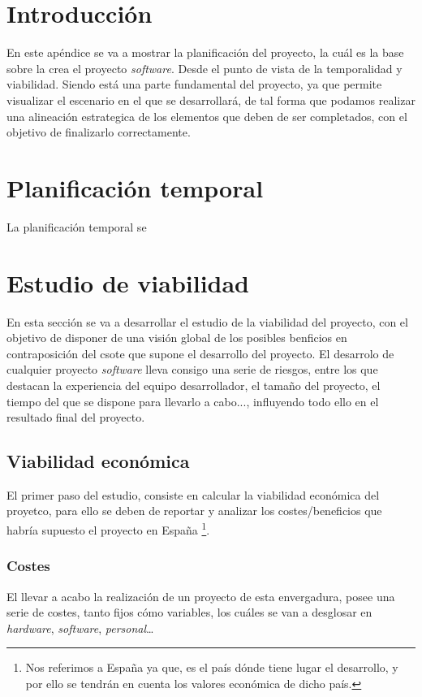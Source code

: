 
\section{Introducción}
En este apéndice se va a mostrar la planificación del proyecto, la cuál es la base sobre la crea el proyecto \textit{software}. Desde el punto de vista de la temporalidad y viabilidad. 
Siendo está una parte fundamental del proyecto, ya que permite visualizar el escenario en el que se desarrollará, de tal forma que podamos realizar una alineación estrategica de los elementos que deben de ser completados, con el objetivo de finalizarlo correctamente.

\section{Planificación temporal}
La planificación temporal se

\section{Estudio de viabilidad}
En esta sección se va a desarrollar el estudio de la viabilidad del proyecto, con el objetivo de disponer de una visión global de los posibles benficios en contraposición del csote que supone el desarrollo del proyecto.
El desarrolo de cualquier proyecto \textit{software} lleva consigo una serie de riesgos, entre los que destacan la experiencia del equipo desarrollador, el tamaño del proyecto, el tiempo del que se dispone para llevarlo a cabo..., influyendo todo ello en el resultado final del proyecto.

\subsection{Viabilidad económica}
El primer paso del estudio, consiste en calcular la viabilidad económica del proyetco, para ello se deben de reportar y analizar los costes/beneficios que habría supuesto el proyecto en España \footnote{Nos referimos a España ya que, es el país dónde tiene lugar el desarrollo, y por ello se tendrán en cuenta los valores económica de dicho país.}.

\subsubsection{Costes}
El llevar a acabo la realización de un proyecto de esta envergadura, posee una serie de costes, tanto fijos cómo variables, los cuáles se van a desglosar en \textit{hardware}, \textit{software}, \textit{personal}\dots

